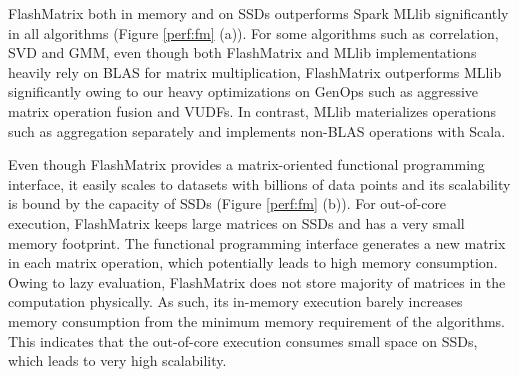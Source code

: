 %		

FlashMatrix both in memory and on SSDs outperforms Spark MLlib significantly
in all algorithms (Figure \ref{perf:fm} (a)). For some algorithms
such as correlation, SVD and GMM, even though both FlashMatrix and MLlib
implementations heavily rely on BLAS for matrix multiplication, FlashMatrix
outperforms MLlib significantly owing to our heavy optimizations on GenOps
such as aggressive matrix operation fusion and VUDFs. In contrast, MLlib
materializes operations such as aggregation separately and implements
non-BLAS operations with Scala.

%		

Even though FlashMatrix provides a matrix-oriented functional programming
interface, it easily scales to datasets with billions of data points and its
scalability is bound by the capacity of SSDs (Figure \ref{perf:fm} (b)).
For out-of-core execution, FlashMatrix keeps large matrices on
SSDs and has a very small memory footprint. The functional programming
interface generates a new matrix in each matrix operation, which potentially
leads to high memory consumption. Owing to lazy evaluation,
FlashMatrix does not store majority of matrices in the computation physically.
As such, its in-memory execution barely increases memory consumption from
the minimum memory requirement of the algorithms. This indicates that
the out-of-core execution consumes small space on SSDs, which leads to
very high scalability.

